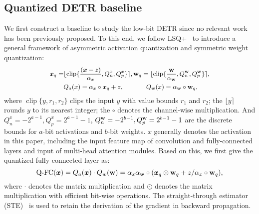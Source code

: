 \documentclass[10pt,twocolumn,letterpaper]{article}
\begin{document}
\subsection{Quantized DETR baseline}
%
%
%
We first construct a baseline to study the low-bit DETR since no relevant work has been previously proposed.
%
To this end, we follow LSQ+~\cite{bhalgat2020lsq} to introduce a general framework of asymmetric activation quantization and symmetric weight quantization:
%
%
\begin{equation}\label{eq:quantization}
\small
    \begin{aligned}
    \bm{x}_q = &\lfloor \operatorname{clip}\{\frac{(\bm{x} - z)}{\alpha_x}, Q_n^x, Q_p^x\} \rceil, {\bf w}_{q} = \lfloor \operatorname{clip}\{\frac{{\bf w}}{\alpha_{\bf w}}, Q_n^{\bf w}, Q_p^{\bf w}\} \rceil,
    \\&
    Q_a(x) = \alpha_x \circ \bm{x}_q + z, \;\;\;\;\;\;\;\;\;\;\;\;\, Q_w(x) = \alpha_{\bf w}\circ {\bf w}_{q},
    \end{aligned}
\end{equation}
%
%
where $\operatorname{clip}\{y, r_1, r_2\}$ clips the input $y$ with value bounds $r_1$ and $r_2$; the $\lfloor y \rceil$ rounds $y$ to its nearest integer; the $\circ$ denotes the channel-wise multiplication. %
%
And $Q_n^x = - 2^{a-1}, Q_p^x = 2^{a-1}-1$, $Q_n^{\bf w} = - 2^{b-1}, Q_p^{\bf w} = 2^{b-1}-1$ are the discrete bounds for $a$-bit activations and $b$-bit weights. $x$ generally denotes the activation in this paper, including the input feature map of convolution and fully-connected layers and input of multi-head attention modules. Based on this, we first give the quantized fully-connected layer as: 
\begin{equation}
\small
     \operatorname{Q-FC}(\bm{x}) = Q_a({\bm{x}}) \cdot Q_w({\bf w}) = \alpha_x\alpha_{\bf w} \circ (\bm{x}_q \odot {\bf w}_q + z / \alpha_x \circ {\bf w}_q), 
     \label{q-fc}
\end{equation}
% 
where $\cdot$ denotes the matrix multiplication and $\odot$ denotes the matrix multiplication with efficient bit-wise operations. The straight-through estimator (STE)~\cite{bengio2013estimating} is used to retain the derivation of the gradient in backward propagation. 
\end{document}
